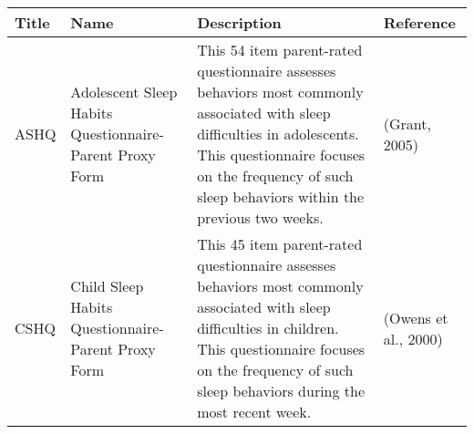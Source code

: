 \documentclass[]{book}
\begin{document}
\begin{longtable}[]{@{}llll@{}}
\toprule
\begin{minipage}[b]{0.22\columnwidth}\raggedright
Title\strut
\end{minipage} & \begin{minipage}[b]{0.27\columnwidth}\raggedright
Name\strut
\end{minipage} & \begin{minipage}[b]{0.22\columnwidth}\raggedright
Description\strut
\end{minipage} & \begin{minipage}[b]{0.18\columnwidth}\raggedright
Reference\strut
\end{minipage}\tabularnewline
\midrule
\endhead
\begin{minipage}[t]{0.22\columnwidth}\raggedright
ASHQ\strut
\end{minipage} & \begin{minipage}[t]{0.27\columnwidth}\raggedright
Adolescent Sleep Habits Questionnaire- Parent Proxy Form\strut
\end{minipage} & \begin{minipage}[t]{0.22\columnwidth}\raggedright
This 54 item parent-rated questionnaire assesses behaviors most commonly associated with sleep difficulties in adolescents. This questionnaire focuses on the frequency of such sleep behaviors within the previous two weeks.\strut
\end{minipage} & \begin{minipage}[t]{0.18\columnwidth}\raggedright
(Grant, 2005)\strut
\end{minipage}\tabularnewline
\begin{minipage}[t]{0.22\columnwidth}\raggedright
CSHQ\strut
\end{minipage} & \begin{minipage}[t]{0.27\columnwidth}\raggedright
Child Sleep Habits Questionnaire- Parent Proxy Form\strut
\end{minipage} & \begin{minipage}[t]{0.22\columnwidth}\raggedright
This 45 item parent-rated questionnaire assesses behaviors most commonly associated with sleep difficulties in children. This questionnaire focuses on the frequency of such sleep behaviors during the most recent week.\strut
\end{minipage} & \begin{minipage}[t]{0.18\columnwidth}\raggedright
(Owens et al., 2000)\strut
\end{minipage}\tabularnewline
\bottomrule
\end{longtable}
\end{document}
